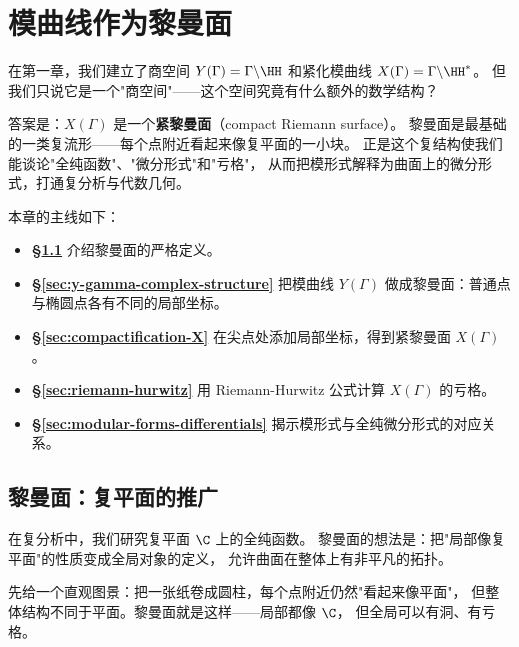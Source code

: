 \chapter{模曲线作为黎曼面}
\label{ch:riemann-surfaces}

在第一章，我们建立了商空间
$Y(\Gamma) = \Gamma \backslash \HH$ 和紧化模曲线
$X(\Gamma) = \Gamma \backslash \HH^*$。
但我们只说它是一个"商空间"——这个空间究竟有什么额外的数学结构？

答案是：$X(\Gamma)$ 是一个\textbf{紧黎曼面}（compact Riemann surface）。
黎曼面是最基础的一类复流形——每个点附近看起来像复平面的一小块。
正是这个复结构使我们能谈论"全纯函数"、"微分形式"和"亏格"，
从而把模形式解释为曲面上的微分形式，打通复分析与代数几何。

本章的主线如下：
\begin{itemize}
  \item \textbf{§\ref{sec:riemann-surface-def}} 介绍黎曼面的严格定义。
  \item \textbf{§\ref{sec:y-gamma-complex-structure}}
    把模曲线 $Y(\Gamma)$ 做成黎曼面：普通点与椭圆点各有不同的局部坐标。
  \item \textbf{§\ref{sec:compactification-X}}
    在尖点处添加局部坐标，得到紧黎曼面 $X(\Gamma)$。
  \item \textbf{§\ref{sec:riemann-hurwitz}}
    用 Riemann-Hurwitz 公式计算 $X(\Gamma)$ 的亏格。
  \item \textbf{§\ref{sec:modular-forms-differentials}}
    揭示模形式与全纯微分形式的对应关系。
\end{itemize}


\section{黎曼面：复平面的推广}
\label{sec:riemann-surface-def}

在复分析中，我们研究复平面 $\C$ 上的全纯函数。
黎曼面的想法是：把"局部像复平面"的性质变成全局对象的定义，
允许曲面在整体上有非平凡的拓扑。

先给一个直观图景：把一张纸卷成圆柱，每个点附近仍然"看起来像平面"，
但整体结构不同于平面。黎曼面就是这样——局部都像 $\C$，
但全局可以有洞、有亏格。

